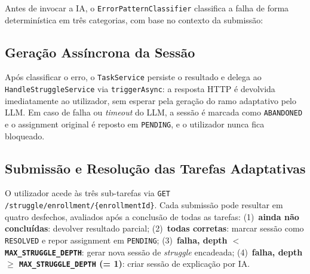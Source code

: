 Antes de invocar a IA, o \texttt{ErrorPatternClassifier} classifica a falha de forma determinística em três categorias, com base no contexto da submissão:

\begin{table}[h!]
\centering
\caption{Padrões de erro classificados pelo ErrorPatternClassifier}
\label{tab:error-patterns}
\end{table}

\subsection*{Geração Assíncrona da Sessão}

Após classificar o erro, o \texttt{TaskService} persiste o resultado e delega ao \texttt{HandleStruggleService} via \texttt{triggerAsync}: a resposta HTTP é devolvida imediatamente ao utilizador, sem esperar pela geração do ramo adaptativo pelo LLM.
Em caso de falha ou \textit{timeout} do LLM, a sessão é marcada como \texttt{ABANDONED} e o assignment original é reposto em \texttt{PENDING}, e o utilizador nunca fica bloqueado.

\subsection*{Submissão e Resolução das Tarefas Adaptativas}

O utilizador acede às três sub-tarefas via \texttt{GET /struggle/enrollment/\{enrollmentId\}}.
Cada submissão pode resultar em quatro desfechos, avaliados após a conclusão de todas as tarefas: (1)~\textbf{ainda não concluídas}: devolver resultado parcial; (2)~\textbf{todas corretas}: marcar sessão como \texttt{RESOLVED} e repor assignment em \texttt{PENDING}; (3)~\textbf{falha, depth $<$ \texttt{MAX\_STRUGGLE\_DEPTH}}: gerar nova sessão de \textit{struggle} encadeada; (4)~\textbf{falha, depth $\geq$ \texttt{MAX\_STRUGGLE\_DEPTH} (= 1)}: criar sessão de explicação por IA.

